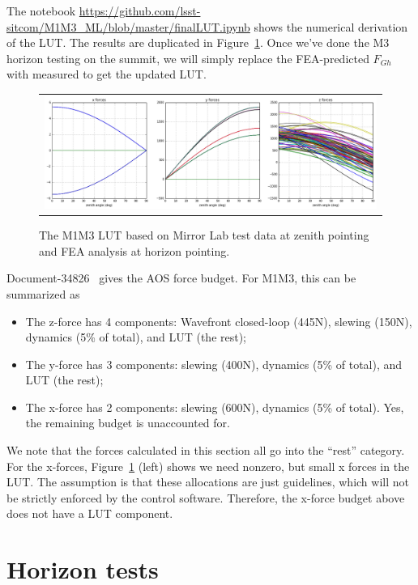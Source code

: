 \documentclass [twoside,openbib,12pt]{article}
\newcommand{\bitm}{\begin{itemize}}
\newcommand{\eitm}{\end{itemize}}
\begin{document}
The notebook
\url{https://github.com/lsst-sitcom/M1M3_ML/blob/master/finalLUT.ipynb} shows
the numerical derivation of the LUT. The results are duplicated in
Figure~\ref{fig:LUT}. Once we've done the M3 horizon testing on the
summit, we will simply replace the FEA-predicted $F_{Gh}$ with
measured to get the updated LUT.


 \begin{figure}[bthp]
   \begin{center}
     \begin{tabular}{c}
\includegraphics[width=170mm]{figures/LUT.png}
  \end{tabular}
   \end{center}
   \caption
   { \label{fig:LUT}
 The M1M3 LUT based on Mirror Lab test data at zenith pointing and FEA
 analysis at horizon pointing.
 }
\end{figure}

Document-34826~\cite{m1m3m2fbudget} gives the AOS force budget. For M1M3, this can be
summarized as
\bitm
\item The z-force has 4 components: Wavefront closed-loop (445N),
  slewing (150N), dynamics (5\% of total), and LUT (the rest);
\item The y-force has 3 components: slewing (400N), dynamics (5\% of
  total), and LUT (the rest);
  \item The x-force has 2 components: slewing (600N), dynamics (5\% of
    total). Yes, the remaining budget is unaccounted for.
  \eitm
  We note that the forces calculated in this section all go into the
  ``rest'' category. For the x-forces,
    Figure~\ref{fig:LUT} (left) shows we need nonzero, but small x
    forces in the LUT. The assumption is that these allocations are
    just guidelines, which will
    not be strictly enforced by the control software.
    Therefore, the x-force budget above does not have a LUT component.

\section{Horizon tests}
\label{sec:horizon}
\end{document}
